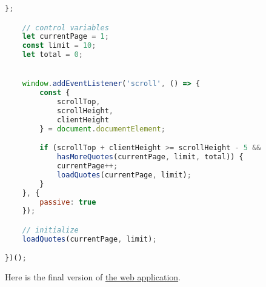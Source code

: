 \documentclass[11pt]{article}
\begin{document}
\begin{lstlisting}[language=JavaScript]
    };

    // control variables
    let currentPage = 1;
    const limit = 10;
    let total = 0;


    window.addEventListener('scroll', () => {
        const {
            scrollTop,
            scrollHeight,
            clientHeight
        } = document.documentElement;

        if (scrollTop + clientHeight >= scrollHeight - 5 &&
            hasMoreQuotes(currentPage, limit, total)) {
            currentPage++;
            loadQuotes(currentPage, limit);
        }
    }, {
        passive: true
    });

    // initialize
    loadQuotes(currentPage, limit);

})();
\end{lstlisting}

\noindent
Here is the final version of \href{https://www.javascripttutorial.net/sample/dom/infinite-scroll/}{the web application}.
\end{document}

